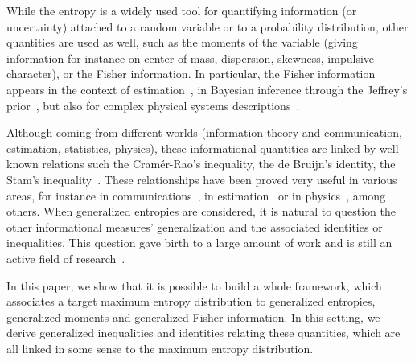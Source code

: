 \documentclass[entropy,article,submit,moreauthors,pdftex]{Definitions/mdpi}
\begin{document}
While  the  entropy is  a  widely  used  tool  for quantifying  information  (or
uncertainty) attached  to a  random variable or  to a  probability distribution,
other quantities are used  as well, such as the moments  of the variable (giving
information  for instance  on center  of mass,  dispersion, skewness,  impulsive
character), or  the Fisher information.   In particular, the  Fisher information
appears in the context of estimation~\cite{Kay93, Fri04}, in Bayesian inference
through the Jeffrey's  prior~\cite{Rob07, Jef46}, but also  for complex physical
systems  descriptions~\cite{Fri04,   VigBer03,  RomAng99,   RomSan06,  SanGon06,
  TorLop15}.


Although  coming from  different worlds  (information theory  and communication,
estimation, statistics,  physics), these informational quantities  are linked by
well-known  relations  such  the  Cram\'er-Rao's  inequality,  the  de  Bruijn's
identity,  the  Stam's  inequality~\cite{CovTho06, Sta59,  DemCov91,  GuoSha05}.
These relationships have been proved very  useful in various areas, for instance
in communications~\cite{Sta59,  DemCov91, CovTho06},  in estimation~\cite{Kay93}
or in physics~\cite{FolSit97, Sen11},  among others.  When generalized entropies
are  considered, it  is natural  to question  the other  informational measures'
generalization and the associated identities or inequalities. This question gave
birth  to   a  large  amount   of  work  and  is   still  an  active   field  of
research~\cite{Vaj73,  Boe77,  Ham78,  BoeVan80, BurRao82,  LutYan04,  LutYan05,
  LutYan07, LutLv12, Ber12:06_1, Ber12:06_2, Ber13, Ber13:08}.

In this  paper, we show that  it is possible  to build a whole  framework, which
associates  a  target maximum  entropy  distribution  to generalized  entropies,
generalized moments  and generalized  Fisher information.   In this  setting, we
derive generalized inequalities and  identities relating these quantities, which
are all linked in some sense to the maximum entropy distribution.


\
\end{document}
